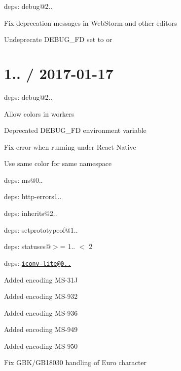 \begin{DoxyItemize}
\item deps\+: debug@2..
\begin{DoxyItemize}
\item Fix deprecation messages in Web\+Storm and other editors
\item Undeprecate {\ttfamily D\+E\+B\+U\+G\+\_\+\+FD} set to {} or {}
\end{DoxyItemize}
\end{DoxyItemize}

\section*{1.. / 2017-\/01-\/17 }


\begin{DoxyItemize}
\item deps\+: debug@2..
\begin{DoxyItemize}
\item Allow colors in workers
\item Deprecated {\ttfamily D\+E\+B\+U\+G\+\_\+\+FD} environment variable
\item Fix error when running under React Native
\item Use same color for same namespace
\item deps\+: ms@0..
\end{DoxyItemize}
\item deps\+: http-\/errors1..
\begin{DoxyItemize}
\item deps\+: inherits@2..
\item deps\+: setprototypeof@1..
\item deps\+: statuses@\textquotesingle{}$>$= 1.. $<$ 2\textquotesingle{}
\end{DoxyItemize}
\item deps\+: \href{mailto:iconv-lite@0.4.15}{\tt iconv-\/lite@0..}
\begin{DoxyItemize}
\item Added encoding M\+S-\/31J
\item Added encoding M\+S-\/932
\item Added encoding M\+S-\/936
\item Added encoding M\+S-\/949
\item Added encoding M\+S-\/950
\item Fix G\+B\+K/\+G\+B18030 handling of Euro character
\end{DoxyItemize}

\end{DoxyItemize}

